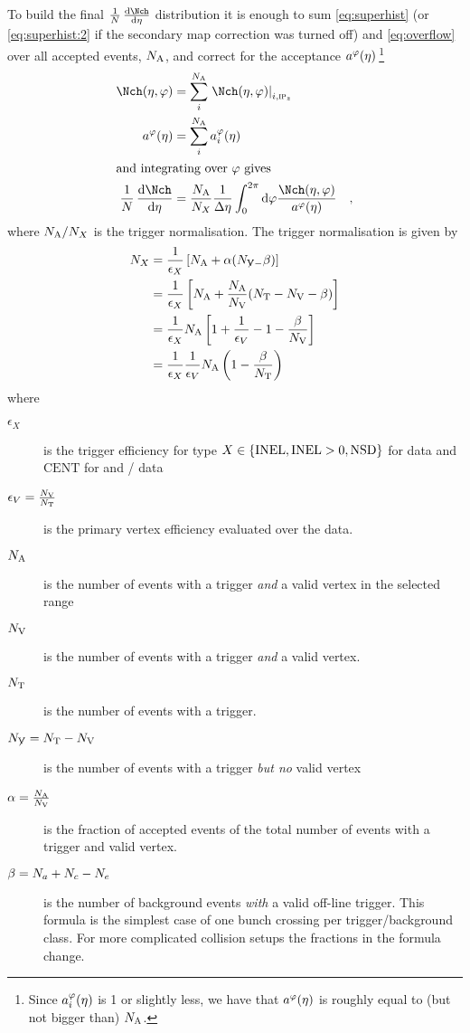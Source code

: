 To build the final $\ndndeta$ distribution it is enough to sum
\eqref{eq:superhist} (or \eqref{eq:superhist:2} if the secondary map
correction was turned off) and \eqref{eq:overflow} over all accepted
events, ${N_{\text{A}}}$, and correct for the acceptance
$a^{\varphi}(\eta){}\,$\footnote{Since $a_i^{\varphi}(\eta)$ is 1 or slightly less, we have
  that $a^{\varphi}(\eta)$ is roughly equal to (but not bigger than) ${N_{\text{A}}}$.}
\begin{align}
  \dndetadphi &= \sum_i^{\NA}\dndetadphi[i,\subIPz]\\ 
  \PhiAcc &= \sum_i^{\NA}\phiAcc\\
\intertext{and integrating over $\varphi$ gives}
  \ndndeta &=
  \frac{\NA}{\N{X}{}} \frac1{\Delta\eta} \int_0^{2\pi} \text{d}\varphi
  \frac{\dndetadphi}{\PhiAcc}\quad,\label{eq:eventnormdndeta}
\end{align}
where ${N_{\text{A}}}/{N_{X}}$ is the trigger normalisation.  The trigger
normalisation is given by 
\begin{align}
  {\ensuremath N_{X}} &= \frac{1}{\epsilon_X}\left[{N_{\text{A}}} +
    \alpha({N_{\not{\text{V}}-}}
    \beta)\right]  \label{eq:fulleventnorm}\\
  & = \frac{1}{\epsilon_X}\left[{N_{\text{A}}} + \frac{{N_{\text{A}}}}{{N_{\text{V}}}}({N_{\text{T}}}-{N_{\text{V}}}{} -
    \beta)\right]\nonumber \\
  & =\frac{1}{\epsilon_X}{N_{\text{A}}}\left[1+\frac{1}{\epsilon_V}-1-
    \frac{\beta}{{N_{\text{V}}}}\right]\nonumber\\
  & = \frac{1}{\epsilon_X}\frac{1}{\epsilon_V}{N_{\text{A}}}
  \left(1-\frac{\beta}{{N_{\text{T}}}{}}\right)\nonumber
\end{align}
where
\begin{description}
\item[$\epsilon_X$]  is the trigger efficiency for type
  $X\in\{\INEL,\INELONE,\NSD\}$ for \ppCol{} data and $\text{CENT}$
  for \PbPbCol{} and \pPbCol{}/\PbpCol{} data
\item[$\epsilon_V=\frac{{N_{\text{V}}}{}}{{N_{\text{T}}}{}}$] is the primary vertex
  efficiency evaluated over the data.
\item[${N_{\text{A}}}$] is the number of events with a trigger \emph{and} a valid
  vertex in the selected range
\item[${N_{\text{V}}}{}$] is the number of events with a trigger \emph{and} a valid
  vertex. 
\item[${N_{\text{T}}}$] is the number of events with a trigger.
\item[${N_{\not{\text{V}}}}={N_{\text{T}}}-{N_{\text{V}}}{}$] is the number of events with a trigger
  \emph{but no} valid vertex
\item[$\alpha=\frac{{N_{\text{A}}}}{{N_{\text{V}}}}$] is the fraction of accepted events of
  the total number of events with a trigger and valid vertex.  
\item[$\beta={N_{a}}+{N_{c}}-{N_{e}}$] is the number of background
  events \emph{with} a valid off-line trigger. This formula is the
  simplest case of one bunch crossing per trigger/background
  class. For more complicated collision setups the fractions in the
  formula change.
\end{description}
